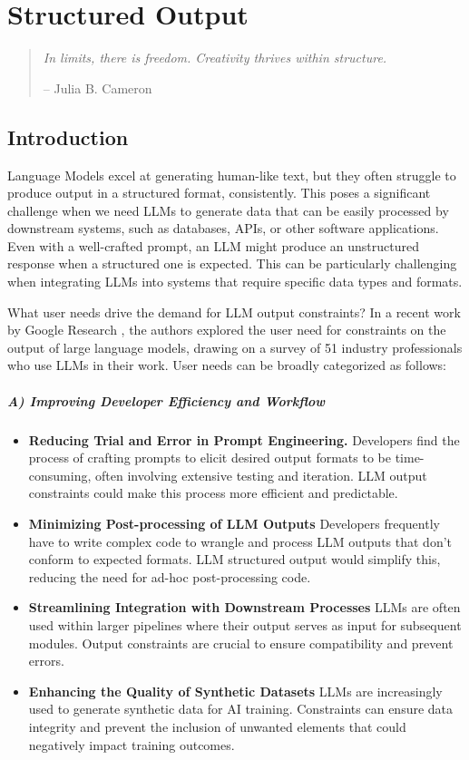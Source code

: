 \setchapterpreamble[u]{\margintoc}
\chapter{Structured Output}

\begin{quote}
\textit{In limits, there is freedom. Creativity thrives within structure.}

\raggedleft -- Julia B. Cameron
\end{quote}

\section{Introduction}

Language Models excel at generating human-like text, but they often struggle to produce output in a structured format, consistently. This poses a significant challenge when we need LLMs to generate data that can be easily processed by downstream systems, such as databases, APIs, or other software applications. Even with a well-crafted prompt, an LLM might produce an unstructured response when a structured one is expected. This can be particularly challenging when integrating LLMs into systems that require specific data types and formats.

What user needs drive the demand for LLM output constraints? In a recent work by Google Research \cite{10.1145/3613905.3650756}, the authors explored the user need for constraints on the output of large language models, drawing on a survey of 51 industry professionals who use LLMs in their work. User needs can be broadly categorized as follows:

\paragraph{A) Improving Developer Efficiency and Workflow}
\begin{itemize}
    \item \textbf{Reducing Trial and Error in Prompt Engineering.} Developers find the process of crafting prompts to elicit desired output formats to be time-consuming, often involving extensive testing and iteration. LLM output constraints could make this process more efficient and predictable.
    \item \textbf{Minimizing Post-processing of LLM Outputs}
Developers frequently have to write complex code to wrangle and process LLM outputs that don't conform to expected formats. LLM structured output would simplify this, reducing the need for ad-hoc post-processing code.
    \item \textbf{Streamlining Integration with Downstream Processes}
LLMs are often used within larger pipelines where their output serves as input for subsequent modules. Output constraints are crucial to ensure compatibility and prevent errors.
    \item \textbf{Enhancing the Quality of Synthetic Datasets}
LLMs are increasingly used to generate synthetic data for AI training. Constraints can ensure data integrity and prevent the inclusion of unwanted elements that could negatively impact training outcomes.
\end{itemize}

